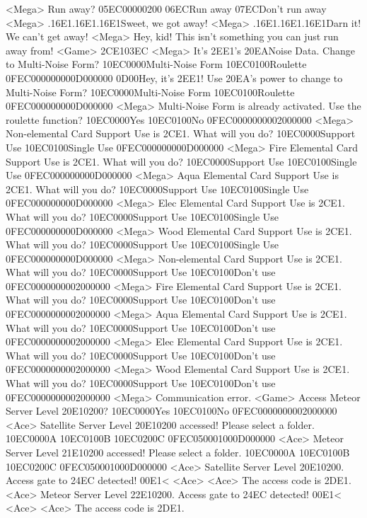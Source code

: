 <Mega> Run away? {05}{EC}{00}{00}{02}{00}  {06}{EC}Run away  {07}{EC}Don't run away 
<Mega> .{16}{E1}.{16}{E1}.{16}{E1}Sweet, we got away! 
<Mega> .{16}{E1}.{16}{E1}.{16}{E1}Darn it! We can't get away! 
<Mega> Hey, kid! This isn't something you can just run away from! 
<Game> {2C}{E1}{03}{EC}
<Mega> It's {2E}{E1}'s {20}{EA}Noise Data. Change to Multi-Noise Form? {10}{EC}{00}{00}Multi-Noise Form {10}{EC}{01}{00}Roulette {0F}{EC}{00}{00}{00}{00}{0D}{00}{00}{00}
{0D}{00}Hey, it's {2E}{E1}! Use {20}{EA}'s power to change to Multi-Noise Form? {10}{EC}{00}{00}Multi-Noise Form {10}{EC}{01}{00}Roulette {0F}{EC}{00}{00}{00}{00}{0D}{00}{00}{00}
<Mega> Multi-Noise Form is already activated. Use the roulette function? {10}{EC}{00}{00}Yes {10}{EC}{01}{00}No {0F}{EC}{00}{00}{00}{00}{02}{00}{00}{00}
<Mega> Non-elemental Card Support Use is {2C}{E1}. What will you do? {10}{EC}{00}{00}Support Use {10}{EC}{01}{00}Single Use {0F}{EC}{00}{00}{00}{00}{0D}{00}{00}{00}
<Mega> Fire Elemental Card Support Use is {2C}{E1}. What will you do? {10}{EC}{00}{00}Support Use {10}{EC}{01}{00}Single Use {0F}{EC}{00}{00}{00}{00}{0D}{00}{00}{00}
<Mega> Aqua Elemental Card Support Use is {2C}{E1}. What will you do? {10}{EC}{00}{00}Support Use {10}{EC}{01}{00}Single Use {0F}{EC}{00}{00}{00}{00}{0D}{00}{00}{00}
<Mega> Elec Elemental Card Support Use is {2C}{E1}. What will you do? {10}{EC}{00}{00}Support Use {10}{EC}{01}{00}Single Use {0F}{EC}{00}{00}{00}{00}{0D}{00}{00}{00}
<Mega> Wood Elemental Card Support Use is {2C}{E1}. What will you do? {10}{EC}{00}{00}Support Use {10}{EC}{01}{00}Single Use {0F}{EC}{00}{00}{00}{00}{0D}{00}{00}{00}
<Mega> Non-elemental Card Support Use is {2C}{E1}. What will you do? {10}{EC}{00}{00}Support Use {10}{EC}{01}{00}Don't use {0F}{EC}{00}{00}{00}{00}{02}{00}{00}{00}
<Mega> Fire Elemental Card Support Use is {2C}{E1}. What will you do? {10}{EC}{00}{00}Support Use {10}{EC}{01}{00}Don't use {0F}{EC}{00}{00}{00}{00}{02}{00}{00}{00}
<Mega> Aqua Elemental Card Support Use is {2C}{E1}. What will you do? {10}{EC}{00}{00}Support Use {10}{EC}{01}{00}Don't use {0F}{EC}{00}{00}{00}{00}{02}{00}{00}{00}
<Mega> Elec Elemental Card Support Use is {2C}{E1}. What will you do? {10}{EC}{00}{00}Support Use {10}{EC}{01}{00}Don't use {0F}{EC}{00}{00}{00}{00}{02}{00}{00}{00}
<Mega> Wood Elemental Card Support Use is {2C}{E1}. What will you do? {10}{EC}{00}{00}Support Use {10}{EC}{01}{00}Don't use {0F}{EC}{00}{00}{00}{00}{02}{00}{00}{00}
<Mega> Communication error. 
<Game> Access Meteor Server Level {20}{E1}{02}{00}? {10}{EC}{00}{00}Yes {10}{EC}{01}{00}No {0F}{EC}{00}{00}{00}{00}{02}{00}{00}{00}
<Ace> Satellite Server Level {20}{E1}{02}{00} accessed! Please select a folder. {10}{EC}{00}{00}A {10}{EC}{01}{00}B {10}{EC}{02}{00}C {0F}{EC}{05}{00}{01}{00}{0D}{00}{00}{00}
<Ace> Meteor Server Level {21}{E1}{02}{00} accessed! Please select a folder. {10}{EC}{00}{00}A {10}{EC}{01}{00}B {10}{EC}{02}{00}C {0F}{EC}{05}{00}{01}{00}{0D}{00}{00}{00}
<Ace> Satellite Server Level {20}{E1}{02}{00}. Access gate to {24}{EC} detected! {00}{E1}< 
<Ace> 
<Ace> The access code is {2D}{E1}. 
<Ace> Meteor Server Level {22}{E1}{02}{00}. Access gate to {24}{EC} detected! {00}{E1}< 
<Ace> 
<Ace> The access code is {2D}{E1}. 
